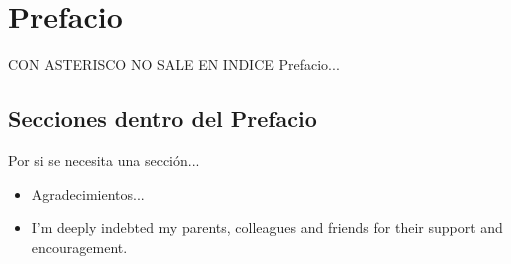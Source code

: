 \chapter*{Prefacio}
CON ASTERISCO NO SALE EN INDICE
Prefacio...

\section*{Secciones dentro del Prefacio}
Por si se necesita una secci\'on...

\begin{itemize}
\item Agradecimientos...

\item I'm deeply indebted my parents, colleagues and friends for their support and encouragement.

\end{itemize}